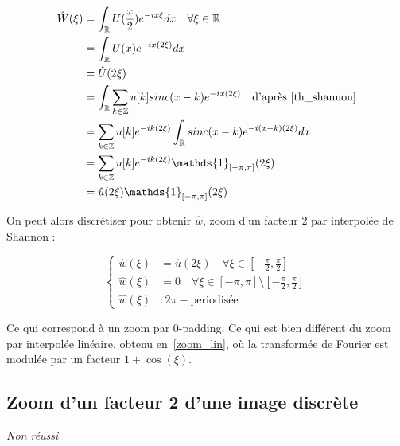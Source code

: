 \documentclass[12pt,a4paper,onecolumn]{article}
\begin{document}
\begin{equation}
	\begin{split}
		\hat{W}(\xi) &= \int_{\mathbb{R}}U(\frac{x}{2})e^{-ix\xi}dx \quad \forall \xi \in \mathbb{R}\\
		&= \int_{\mathbb{R}}U(x)e^{-ix(2\xi)}dx\\
		&= \hat{U}(2\xi)\\
		&=  \int_{\mathbb{R}}\sum_{k\in\mathbb{Z}} u[k]sinc(x-k) e^{-ix(2\xi)} \quad \text{d'après \eqref{th_shannon}}\\
		&= \sum_{k\in\mathbb{Z}} u[k] e^{-ik(2\xi)}\int_{\mathbb{R}} sinc(x-k) e^{-i(x-k)(2\xi)}dx\\
		&= \sum_{k\in\mathbb{Z}} u[k] e^{-ik(2\xi)} \mathds{1}_{[-\pi, \pi]}(2\xi)\\
		&= \hat{u}(2\xi)\mathds{1}_{[-\pi, \pi]}(2\xi)\\
	\end{split}
\end{equation}

On peut alors discrétiser pour obtenir \(\hat{w}\), zoom d'un facteur 2 par interpolée de Shannon :

\begin{equation}
	\left\{
	\begin{split}
		\hat{w}(\xi) &= \hat{u}(2\xi) \quad \forall \xi \in [-\frac{\pi}{2}, \frac{\pi}{2}]\\
		\hat{w}(\xi) &= 0 \quad \forall \xi \in [-\pi, \pi] \setminus [-\frac{\pi}{2}, \frac{\pi}{2}]\\
		\hat{w}(\xi) &: 2\pi-\text{periodisée}
	\end{split}
	\right.
	\label{zoom_shannon}
\end{equation}

Ce qui correspond à un zoom par 0-padding. Ce qui est bien différent du zoom par interpolée linéaire, obtenu en~\eqref{zoom_lin}, où la transformée de Fourier est modulée par un facteur \(1 + \cos(\xi)\).

\subsection{Zoom d'un facteur 2 d'une image discrète}

\textit{Non réussi}

\end{document}
